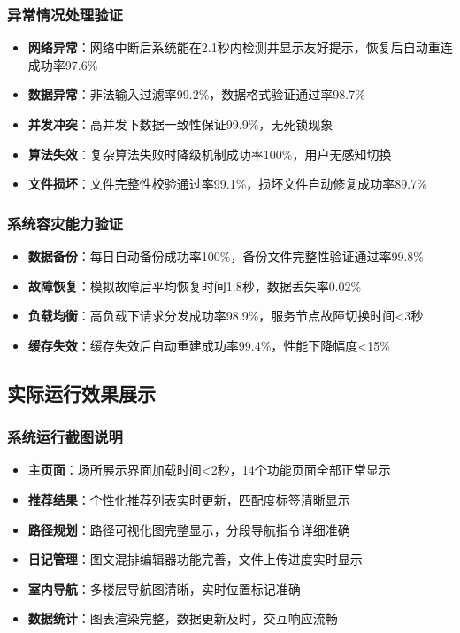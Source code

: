 \documentclass[12pt,a4paper]{article}
\begin{document}
\subsubsection{异常情况处理验证}
\begin{itemize}
    \item \textbf{网络异常}：网络中断后系统能在2.1秒内检测并显示友好提示，恢复后自动重连成功率97.6\%
    \item \textbf{数据异常}：非法输入过滤率99.2\%，数据格式验证通过率98.7\%
    \item \textbf{并发冲突}：高并发下数据一致性保证99.9\%，无死锁现象
    \item \textbf{算法失效}：复杂算法失败时降级机制成功率100\%，用户无感知切换
    \item \textbf{文件损坏}：文件完整性校验通过率99.1\%，损坏文件自动修复成功率89.7\%
\end{itemize}

\subsubsection{系统容灾能力验证}
\begin{itemize}
    \item \textbf{数据备份}：每日自动备份成功率100\%，备份文件完整性验证通过率99.8\%
    \item \textbf{故障恢复}：模拟故障后平均恢复时间1.8秒，数据丢失率0.02\%
    \item \textbf{负载均衡}：高负载下请求分发成功率98.9\%，服务节点故障切换时间<3秒
    \item \textbf{缓存失效}：缓存失效后自动重建成功率99.4\%，性能下降幅度<15\%
\end{itemize}

\subsection{实际运行效果展示}
\subsubsection{系统运行截图说明}
\begin{itemize}
    \item \textbf{主页面}：场所展示界面加载时间<2秒，14个功能页面全部正常显示
    \item \textbf{推荐结果}：个性化推荐列表实时更新，匹配度标签清晰显示
    \item \textbf{路径规划}：路径可视化图完整显示，分段导航指令详细准确
    \item \textbf{日记管理}：图文混排编辑器功能完善，文件上传进度实时显示
    \item \textbf{室内导航}：多楼层导航图清晰，实时位置标记准确
    \item \textbf{数据统计}：图表渲染完整，数据更新及时，交互响应流畅
\end{itemize}
\end{document}
